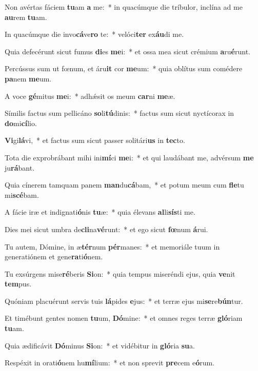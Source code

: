 \item Non avértas fáciem \textbf{tu}am \textbf{a} me:~* in quacúmque die tríbulor, inclína ad me \textbf{au}rem \textbf{tu}am.
\item In quacúmque die invo\textbf{cá}ve\textbf{ro} te:~* velóci\textbf{ter} ex\textbf{áu}di me.
\item Quia defecérunt sicut fumus \textbf{di}es \textbf{me}i:~* et ossa mea sicut crémium \textbf{a}ru\textbf{é}runt.
\item Percússus sum ut fœnum, et áru\textbf{it} cor \textbf{me}um:~* quia oblítus sum comédere \textbf{pa}nem \textbf{me}um.
\item A voce \textbf{gé}mitus \textbf{me}i:~* adhǽsit os meum \textbf{car}ni \textbf{me}æ.
\item Símilis factus sum pellicáno \textbf{so}li\textbf{tú}dinis:~* factus sum sicut nyctícorax in \textbf{do}mi\textbf{cí}lio.
\item \textbf{Vi}gi\textbf{lá}vi,~* et factus sum sicut passer solitári\textbf{us} in \textbf{tec}to.
\item Tota die exprobrábant mihi ini\textbf{mí}ci \textbf{me}i:~* et qui laudábant me, advérsum \textbf{me} ju\textbf{rá}bant.
\item Quia cínerem tamquam panem \textbf{man}du\textbf{cá}bam,~* et potum meum cum \textbf{fle}tu mi\textbf{scé}bam.
\item A fácie iræ et indignati\textbf{ó}nis \textbf{tu}æ:~* quia élevans \textbf{al}li\textbf{sís}ti me.
\item Dies mei sicut umbra de\textbf{cli}na\textbf{vé}runt:~* et ego sicut \textbf{fœ}num \textbf{á}rui.
\item Tu autem, Dómine, in æ\textbf{tér}num \textbf{pér}manes:~* et memoriále tuum in generatiónem et gene\textbf{ra}ti\textbf{ó}nem.
\item Tu exsúrgens mise\textbf{ré}beris \textbf{Si}on:~* quia tempus miseréndi ejus, quia \textbf{ve}nit \textbf{tem}pus.
\item Quóniam placuérunt servis tuis \textbf{lá}pides \textbf{e}jus:~* et terræ ejus mi\textbf{se}re\textbf{bún}tur.
\item Et timébunt gentes nomen \textbf{tu}um, \textbf{Dó}mine:~* et omnes reges terræ \textbf{gló}riam \textbf{tu}am.
\item Quia ædificávit \textbf{Dó}minus \textbf{Si}on:~* et vidébitur in \textbf{gló}ria \textbf{su}a.
\item Respéxit in orati\textbf{ó}nem hu\textbf{mí}lium:~* et non sprevit \textbf{pre}cem e\textbf{ó}rum.
